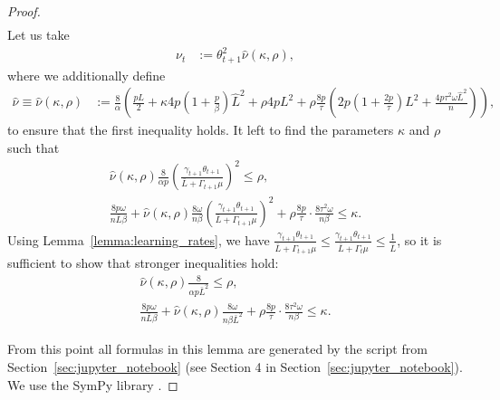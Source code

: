\documentclass{article} %
\theoremstyle{plain}
\theoremstyle{definition}
\theoremstyle{remark}
\newcommand{\eqdef}{:=}
\begin{document}
\begin{proof}
\begin{equation*}
\begin{gathered}
  \end{gathered}
  \end{equation*}
  Let us take 
  \begin{align}
    \nu_{t} &\eqdef \theta_{t+1}^2 \widehat{\nu}(\kappa, \rho),
    \label{eq:nu_sol}
  \end{align}
  where we additionally define 
  \begin{align}
    \label{eq:nu_sol_hat}
    \widehat{\nu} \equiv \widehat{\nu}(\kappa, \rho) &\eqdef \frac{8}{\alpha} \left(\frac{pL}{2} + \kappa 4 p \left(1 + \frac{p}{\beta}\right) \widehat{L}^2 + \rho 4 p L^2 + \rho\frac{8 p}{\tau} \left(2 p \left(1 + \frac{2 p}{\tau}\right) L^2 + \frac{4 p \tau^2 \omega \widehat{L}^2}{n}\right) \right),
  \end{align}
    to ensure that the first inequality holds. It left to find the parameters $\kappa$ and $\rho$ such that
  \begin{equation*}
    \begin{gathered}
      \widehat{\nu}(\kappa, \rho) \frac{8}{\alpha p} \left(\frac{\gamma_{t+1} \theta_{t+1}}{\bar{L} + \Gamma_{t+1} \mu}\right)^2 \leq \rho, \\
      \frac{8 p \omega}{n \bar{L} \beta} + \widehat{\nu}(\kappa, \rho) \frac{8 \omega}{n \beta} \left(\frac{\gamma_{t+1} \theta_{t+1}}{\bar{L} + \Gamma_{t+1} \mu}\right)^2 + \rho\frac{8 p}{\tau} \cdot \frac{8 \tau^2 \omega}{n \beta}\leq \kappa.
    \end{gathered}
    \end{equation*}
    Using Lemma~\ref{lemma:learning_rates}, we have $\frac{\gamma_{t+1} \theta_{t+1}}{\bar{L} + \Gamma_{t+1} \mu} \leq \frac{\gamma_{t+1} \theta_{t+1}}{\bar{L} + \Gamma_{t} \mu} \leq \frac{1}{\bar{L}}$, so it is sufficient to show that stronger inequalities hold:
    \begin{align}
        \widehat{\nu}(\kappa, \rho) \frac{8}{\alpha p \bar{L}^2} \leq \rho, \label{eq:rho_ineq} \\
        \frac{8 p \omega}{n \bar{L} \beta} + \widehat{\nu}(\kappa, \rho) \frac{8 \omega}{n \beta \bar{L}^2} + \rho\frac{8 p}{\tau} \cdot \frac{8 \tau^2 \omega}{n \beta}\leq \kappa. \label{eq:kappa_ineq}
    \end{align}
    
    From this point all formulas in this lemma are generated by the script from Section~\ref{sec:jupyter_notebook} (see Section 4 in Section~\ref{sec:jupyter_notebook}). We use the SymPy library \citep{sympy}.


\end{proof}
\end{document}
